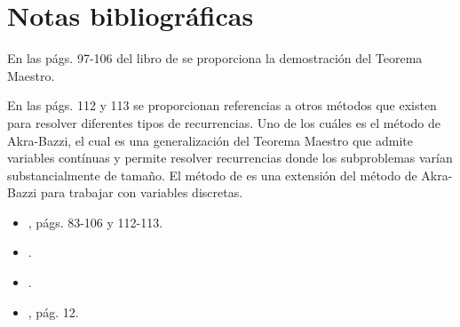 \section*{Notas bibliográficas}

En las págs. 97-106 del libro de \textcite{cormen_introduction_2009} se
proporciona la demostración del Teorema Maestro. 

En las págs. 112 y 113
se proporcionan referencias a otros métodos que existen para resolver 
diferentes tipos
de recurrencias. Uno de los cuáles es el método de Akra-Bazzi, el cual
es una generalización del Teorema Maestro que admite variables contínuas
y permite resolver recurrencias donde los subproblemas varían substancialmente
de tamaño. El método de \textcite{drmota_master_2013} es una extensión
del método de Akra-Bazzi para trabajar con variables discretas. 

\begin{itemize}
    \item \textcite{cormen_introduction_2009}, págs. 83-106 y 112-113.
    \item \textcite{akra_solution_1998}.
    \item \textcite{drmota_master_2013}.
    \item \textcite{goodrich_algorithm_2001}, pág. 12.
\end{itemize}
